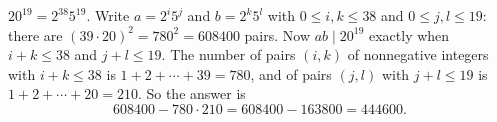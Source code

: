$20^{19}=2^{38}5^{19}$. Write $a=2^{i}5^{j}$ and $b=2^{k}5^{l}$ with $0\le i,k\le38$ and $0\le j,l\le19$: there are $(39\cdot20)^2=780^2=608400$ pairs. Now $ab\mid20^{19}$ exactly when $i+k\le38$ and $j+l\le19$. The number of pairs $(i,k)$ of nonnegative integers with $i+k\le38$ is $1+2+\cdots+39=780$, and of pairs $(j,l)$ with $j+l\le19$ is $1+2+\cdots+20=210$. So the answer is
\[608400-780\cdot210=608400-163800=\boxed{444600}.\]
